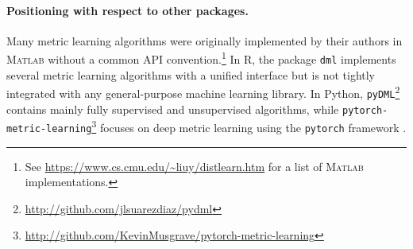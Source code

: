 \documentclass[twoside,11pt]{article}
\newcommand{\aurelien}[1]{\todo[inline,caption={},color=orange!40]{{\it Aurelien:~}#1}}
\newcommand{\MATLAB}{\textsc{Matlab}\xspace}
\begin{document}
\paragraph{Positioning with respect to other packages.} Many metric learning algorithms were originally implemented by their authors in \MATLAB without a common API convention.\footnote{See \url{https://www.cs.cmu.edu/~liuy/distlearn.htm} for a list of \MATLAB implementations.}  In R, the package \texttt{dml} \citep{Tang18} implements several metric learning algorithms with a unified interface but is not tightly integrated with any general-purpose machine learning library. In Python, \texttt{pyDML}\footnote{\url{http://github.com/jlsuarezdiaz/pydml}} contains mainly fully supervised and unsupervised algorithms, while \texttt{pytorch-metric-learning}\footnote{\url{http://github.com/KevinMusgrave/pytorch-metric-learning}} focuses on deep metric learning using the \texttt{pytorch} framework \citep{pytorch}.


\end{document}
